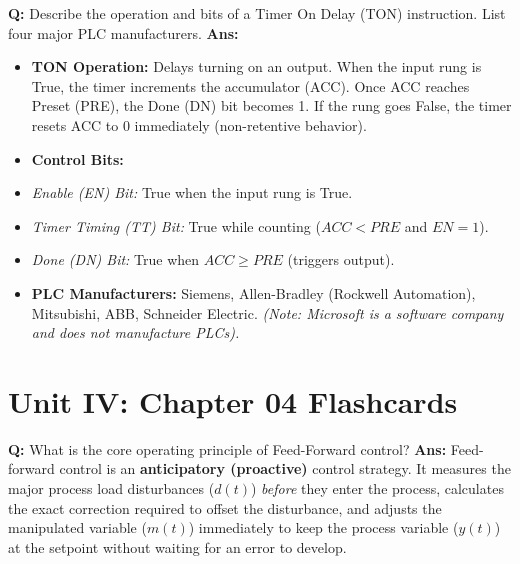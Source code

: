 \documentclass[10pt,a4paper,twocolumn]{article}
\begin{document}
\begin{tcolorbox}[
  colback=white,
  colframe=UnitColorThree,
  colbacktitle=gray!10!white,
  coltitle=black,
  fonttitle=\bfseries\sffamily\small,
  title={Unit III $\bullet$ Card 16: TON Timer \& Manufacturers (Q3.5)},
  boxrule=1.2pt,
  arc=2mm,
  outer arc=2mm,
  boxsep=1.5mm,
  top=1mm,
  bottom=1mm,
  left=1.5mm,
  right=1.5mm,
  before skip=2.5mm,
  after skip=2.5mm
]
\textbf{Q:} Describe the operation and bits of a Timer On Delay (TON) instruction. List four major PLC manufacturers.
\tcbline
\textbf{Ans:} \begin{itemize}
  \item   \textbf{TON Operation:} Delays turning on an output. When the input rung is True, the timer increments the accumulator (ACC). Once ACC reaches Preset (PRE), the Done (DN) bit becomes 1. If the rung goes False, the timer resets ACC to 0 immediately (non-retentive behavior).
  \item   \textbf{Control Bits:}
  \item   \textit{Enable (EN) Bit:} True when the input rung is True.
  \item   \textit{Timer Timing (TT) Bit:} True while counting ($ACC < PRE$ and $EN = 1$).
  \item   \textit{Done (DN) Bit:} True when $ACC \ge PRE$ (triggers output).
  \item   \textbf{PLC Manufacturers:} Siemens, Allen-Bradley (Rockwell Automation), Mitsubishi, ABB, Schneider Electric. \textit{(Note: Microsoft is a software company and does not manufacture PLCs).}
\end{itemize}
\end{tcolorbox}

\section*{Unit IV: Chapter 04 Flashcards}

\begin{tcolorbox}[
  colback=white,
  colframe=UnitColorFour,
  colbacktitle=gray!10!white,
  coltitle=black,
  fonttitle=\bfseries\sffamily\small,
  title={Unit IV $\bullet$ Card 1: Feed-Forward Control Principle},
  boxrule=1.2pt,
  arc=2mm,
  outer arc=2mm,
  boxsep=1.5mm,
  top=1mm,
  bottom=1mm,
  left=1.5mm,
  right=1.5mm,
  before skip=2.5mm,
  after skip=2.5mm
]
\textbf{Q:} What is the core operating principle of Feed-Forward control?
\tcbline
\textbf{Ans:} Feed-forward control is an \textbf{anticipatory (proactive)} control strategy. It measures the major process load disturbances ($d(t)$) \textit{before} they enter the process, calculates the exact correction required to offset the disturbance, and adjusts the manipulated variable ($m(t)$) immediately to keep the process variable ($y(t)$) at the setpoint without waiting for an error to develop.
\end{tcolorbox}
\end{document}
